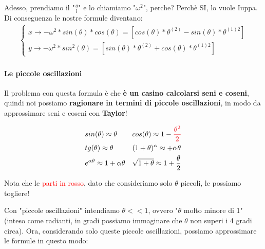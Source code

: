                 Adesso, prendiamo il "$\frac{g}{l}$" e lo chiamiamo "$\omega^2$", perche? Perchè SI, lo vuole Iuppa. Di conseguenza le nostre formule diventano:
                \begin{align*}
                    \begin{cases}
                        x\rightarrow -\omega^2*sin(\theta)*cos(\theta) = [cos(\theta)*\theta^{(2)}-sin(\theta)*\theta^{(1)2}] \\
                        y\rightarrow -\omega^2*sin^2(\theta) = [sin(\theta)*\theta^{(2)}+cos(\theta)*\theta^{(1)2}]
                    \end{cases}
                \end{align*}

            \paragraph{Le piccole oscillazioni}
                Il problema con questa formula è che \textbf{è un casino calcolarsi seni e coseni}, quindi noi possiamo \textbf{ragionare in termini di piccole oscillazioni}, in modo da approssimare seni e coseni con \textbf{Taylor}!

                \begin{mdframed}
                    \begin{align*}
                        & sin(\theta) \approx \theta && cos(\theta)\approx 1-\textcolor{Red}{\frac{\theta^2}{2}}\\
                        & tg(\theta)\approx\theta && (1+\theta)^\alpha \approx +\alpha\theta\\
                        & e^{\alpha\theta}\approx1+\alpha\theta&&\sqrt{1+\theta}\approx 1+\frac{\theta}{2}
                    \end{align*}
                    \begin{center}
                        Nota che le \textcolor{Red}{parti in rosso}, dato che consideriamo solo $\theta$ piccoli, le possiamo togliere!
                    \end{center}
                \end{mdframed}

                Con "piccole oscillazioni" intendiamo $\theta << 1$, ovvero "$\theta$ molto minore di 1" (inteso come radianti, in gradi possiamo immaginare che $\theta$ non superi i 4 gradi circa). Ora, considerando solo queste piccole oscillazioni, possiamo approssimare le formule in questo modo:

